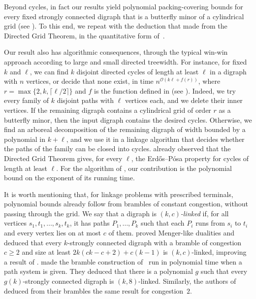 \documentclass[fontsize=12pt,leading=14pt]{fullpaper}
\begin{document}
Beyond cycles, in fact our results yield polynomial packing-covering bounds for every fixed strongly connected digraph that is a butterfly minor of a cylindrical grid (see ).
To this end, we repeat with  the deduction that \textcite{AKKW16} made from the Directed Grid Theorem, in the quantitative form of~\cite[Theorem~1.6]{HKMM26b}.

Our result also has algorithmic consequences, through the typical win-win approach according to large and small directed treewidth. For instance, for fixed $k$ and $\ell$, we can find $k$ disjoint directed cycles of length at least $\ell$ in a digraph with $n$ vertices, or decide that none exist, in time $n^{\mathcal{O}(k\ell+f(r))}$, where $r=\max\{2,k,\lceil\ell/2\rceil\}$  and $f$ is the function defined in  (see ).
Indeed, we try every family of $k$ disjoint paths with $\ell$ vertices each, and we delete their inner vertices.
If the remaining digraph contains a cylindrical grid of order $r$ as a butterfly minor, then the input digraph contains the desired cycles.
Otherwise, we find an arboreal decomposition of the remaining digraph of width bounded by a polynomial in $k+\ell$, and we use it in a linkage algorithm that decides whether the paths of the family can be closed into cycles.
\textcite[Section~1]{KawarabayashiK15} already observed that the Directed Grid Theorem gives, for every $\ell$, the Erd\H{o}s--P\'osa property for cycles of length at least $\ell$.
For the algorithm of , our contribution is the polynomial bound on the exponent of its running time.

It is worth mentioning that, for linkage problems with prescribed terminals, polynomial bounds already follow from brambles of constant congestion, without passing through the grid.
We say that a digraph is \emph{$(k,c)$-linked} if, for all vertices $s_1,t_1,\dots,s_k,t_k$, it has paths $P_1,\dots,P_k$ such that each $P_i$ runs from $s_i$ to $t_i$ and every vertex lies on at most $c$ of them.
\textcite{CCLS25} proved Menger-like dualities and deduced that every $k$-strongly connected digraph with a bramble of congestion $c\ge2$ and size at least $2k(ck-c+2)+c(k-1)$ is $(k,c)$-linked, improving a result of \textcite{EMW17}.
\textcite{LS26} made the bramble construction of~\cite{MPRS22} run in polynomial time when a path system is given.
They deduced that there is a polynomial $g$ such that every $g(k)$-strongly connected digraph is $(k,8)$-linked.
Similarly, the authors of~\cite{CLNS26} deduced from their brambles the same result for congestion~$2$.
\end{document}
